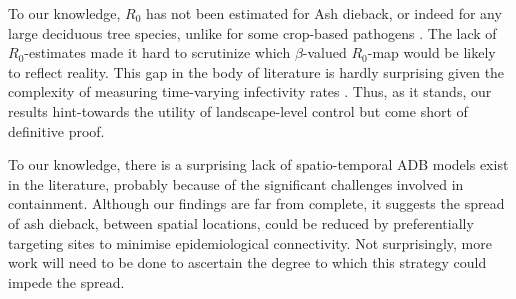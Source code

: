 
To our knowledge, $R_0$ has not been estimated for Ash dieback, or indeed for any large deciduous tree species, unlike for some crop-based pathogens \cite{segarra2001epidemic}. The lack of $R_0$-estimates made it hard to scrutinize which $\beta$-valued $R_0$-map would be likely to reflect reality. This gap in the body of literature is hardly surprising given the complexity of measuring time-varying infectivity rates \cite{13-challenges}. Thus, as it stands, our results hint-towards the utility of landscape-level control but come short of definitive proof.







To our knowledge, there is a surprising lack of spatio-temporal ADB models exist in the literature, probably because of the significant challenges involved in containment. Although our findings are far from complete, it suggests the spread of ash dieback, between spatial locations, could be reduced by preferentially targeting sites to minimise epidemiological connectivity. Not surprisingly, more work will need to be done to ascertain the degree to which this strategy could impede the spread. 

